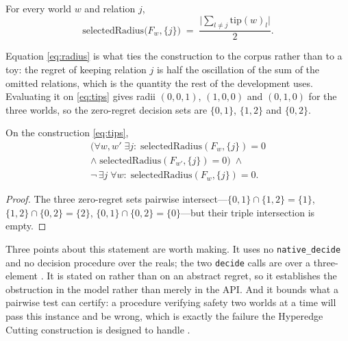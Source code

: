 \begin{proposition}
\label{prop:radius}
For every world $w$ and relation $j$,
\begin{equation}
\mathrm{selectedRadius}\bigl(F_{w},\{j\}\bigr)
\;=\;\frac{\bigl|\sum_{l\neq j}\mathrm{tip}(w)_{l}\bigr|}{2}.
\label{eq:radius}
\end{equation}
\end{proposition}


Equation \eqref{eq:radius} is what ties the construction to the corpus rather than to a toy:
the regret of keeping relation $j$ is half the oscillation of the sum of the omitted
relations, which is the quantity the rest of the development uses. Evaluating it on
\eqref{eq:tips} gives radii $(0,0,1)$, $(1,0,0)$ and $(0,1,0)$ for the three worlds, so the
zero-regret decision sets are $\{0,1\}$, $\{1,2\}$ and $\{0,2\}$.

\begin{theorem}
\label{thm:threeworld}
On the construction \eqref{eq:tips},
\begin{multline}
\bigl(\forall w,w'\;\exists j:\;
 \mathrm{selectedRadius}(F_{w},\{j\})=0 \\ \wedge\;
 \mathrm{selectedRadius}(F_{w'},\{j\})=0\bigr)
\;\wedge\;\\
\neg\,\exists j\;\forall w:\;\mathrm{selectedRadius}(F_{w},\{j\})=0 .
\label{eq:threeworld}
\end{multline}
\end{theorem}

\begin{proof}
The three zero-regret sets pairwise intersect---$\{0,1\}\cap\{1,2\}=\{1\}$,
$\{1,2\}\cap\{0,2\}=\{2\}$, $\{0,1\}\cap\{0,2\}=\{0\}$---but their triple intersection is
empty.
\end{proof}


Three points about this statement are worth making. It uses no \texttt{native\_decide} and no
decision procedure over the reals; the two \texttt{decide} calls are over a three-element
. It is stated on  rather than on an abstract
regret, so it establishes the obstruction in the model rather than merely in the API. And it
bounds what a pairwise test can certify: a procedure verifying safety two worlds at a time
will pass this instance and be wrong, which is exactly the failure the Hyperedge Cutting
construction is designed to handle \cite{javdani2014}.

